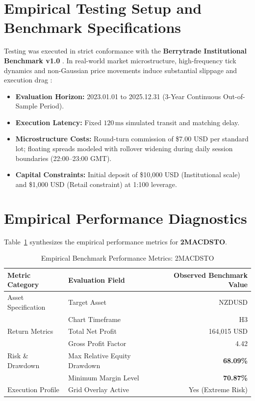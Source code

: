 \documentclass[11pt,a4paper]{article}
\begin{document}
\section{Empirical Testing Setup and Benchmark Specifications}
Testing was executed in strict conformance with the \textbf{Berrytrade Institutional Benchmark v1.0} \cite{artsu2026illusion}. In real-world market microstructure, high-frequency tick dynamics and non-Gaussian price movements induce substantial slippage and execution drag \cite{kyle1985continuous, amihud2002illiquidity, cont2001empirical, mandelbrot1963variation}:
\begin{itemize}
    \item \textbf{Evaluation Horizon:} 2023.01.01 to 2025.12.31 (3-Year Continuous Out-of-Sample Period).
    \item \textbf{Execution Latency:} Fixed $120\,\text{ms}$ simulated transit and matching delay.
    \item \textbf{Microstructure Costs:} Round-turn commission of \$7.00 USD per standard lot; floating spreads modeled with rollover widening during daily session boundaries (22:00--23:00 GMT).
    \item \textbf{Capital Constraints:} Initial deposit of \$10,000 USD (Institutional scale) and \$1,000 USD (Retail constraint) at 1:100 leverage.
\end{itemize}

\section{Empirical Performance Diagnostics}
Table~\ref{tab:metrics} synthesizes the empirical performance metrics for \textbf{2MACDSTO}.

\begin{table}[H]
\centering
\caption{Empirical Benchmark Performance Metrics: 2MACDSTO}
\label{tab:metrics}
\begin{tabular}{llr}
\toprule
\textbf{Metric Category} & \textbf{Evaluation Field} & \textbf{Observed Benchmark Value} \\
\midrule
Asset Specification & Target Asset & NZDUSD \\
& Chart Timeframe & H3 \\
Return Metrics & Total Net Profit & 164,015 USD \\
& Gross Profit Factor & 4.42 \\
Risk \& Drawdown & Max Relative Equity Drawdown & \textbf{68.09\%} \\
& Minimum Margin Level & \textbf{70.87\%} \\
Execution Profile & Grid Overlay Active & Yes (Extreme Risk) \\
\bottomrule
\end{tabular}
\end{table}
\end{document}
